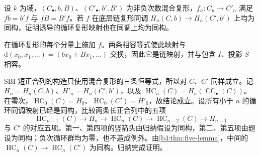 \begin{optionalexercise}\label{b4:ex:mixed-quasiisomorphism-cyclic}
	设 \(k\) 为域，\((C_\bullet,b,B)\)、\((C'_\bullet,b',B')\) 为非负次数混合复形，\(f_n:C_n\to C'_n\) 满足 \(f b=b'f\) 与 \(f B=B'f\)。若 \(f\) 在底层链复形同调 \(H_n(C,b)\to H_n(C',b')\) 上均为同构，证明诱导的循环复形映射也在同调上均为同构。
\end{optionalexercise}
\begin{solution}
	在循环复形的每个分量上施加 \(f\)。两条相容等式使此映射与 \(\mathrm d(x_0,x_1,\ldots)=(b x_0+B x_1,\ldots)\) 交换，因此它是链映射，并与包含 \(I\)、投影 \(S\) 相容。

	SBI 短正合列的构造只使用混合复形的三条恒等式，所以对 \(C\)、\(C'\) 同样成立。记 \(H_n=H_n(C,b)\)、\(H'_n=H_n(C',b')\)，以及 \(\operatorname{HC}_n(C)=H_n(\operatorname{CC}_\bullet(C))\)。在零次，\(\operatorname{HC}_0(C)=H_0\)、\(\operatorname{HC}_0(C')=H'_0\)，故结论成立。设所有小于 \(n\) 的循环同调映射已经是同构，比较两条长正合列中的五项
	\[
		\operatorname{HC}_{n-1}(C)\longrightarrow H_n
		\longrightarrow\operatorname{HC}_n(C)
		\longrightarrow\operatorname{HC}_{n-2}(C)\longrightarrow H_{n-1}
	\]
	与 \(C'\) 的对应五项。第一、第四项的竖箭头由归纳假设为同构，第二、第五项由题设为同构；负次循环群均为零，也不造成例外。由\cref{b4:thm:five-lemma}，中间的 \(\operatorname{HC}_n(C)\to\operatorname{HC}_n(C')\) 为同构。归纳完成证明。
\end{solution}
